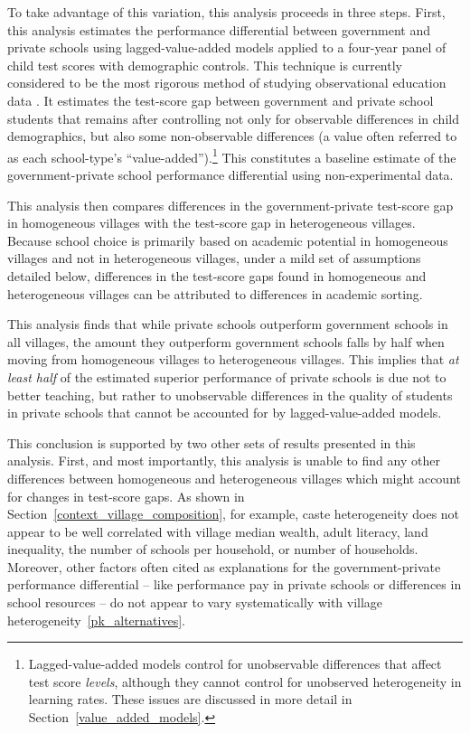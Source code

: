 \documentclass[Eubank_pk_ethnic_sorting.tex]{subfiles}
\begin{document}
To take advantage of this variation, this analysis proceeds in three steps. First, this analysis estimates the performance differential between government and private schools using lagged-value-added models applied to a four-year panel of child test scores with demographic controls. This technique is currently considered to be the most rigorous method of studying observational education data \citep{Gordon:2006wt,McCaffrey:2003vk,Hanushek:2003hz}. It estimates the test-score gap between government and private school students that remains after controlling not only for observable differences in child demographics, but also some non-observable differences (a value often referred to as each school-type's ``value-added'').\footnote{Lagged-value-added models control for unobservable differences that affect test score \emph{levels}, although they cannot control for unobserved heterogeneity in learning rates. These issues are discussed in more detail in Section~\ref{value_added_models}.} This constitutes a baseline estimate of the government-private school performance differential using non-experimental data.

This analysis then compares differences in the government-private test-score gap in homogeneous villages with the test-score gap in heterogeneous villages. Because school choice is primarily based on academic potential in homogeneous villages and not in heterogeneous villages, under a mild set of assumptions detailed below, differences in the test-score gaps found in homogeneous and heterogeneous villages can be attributed to differences in academic sorting.

This analysis finds that while private schools outperform government schools in all villages, the amount they outperform government schools falls by half when moving from homogeneous villages to heterogeneous villages. This implies that \emph{at least half} of the estimated superior performance of private schools is due not to better teaching, but rather to unobservable differences in the quality of students in private schools that cannot be accounted for by lagged-value-added models. 

This conclusion is supported by two other sets of results presented in this analysis. First, and most importantly, this analysis is unable to find any other differences between homogeneous and heterogeneous villages which might account for changes in test-score gaps. As shown in Section~\ref{context_village_composition}, for example, caste heterogeneity does not appear to be well correlated with village median wealth, adult literacy, land inequality, the number of schools per household, or number of households. Moreover, other factors often cited as explanations for the government-private performance differential -- like performance pay in private schools or differences in school resources --  do not appear to vary systematically with village heterogeneity~\ref{pk_alternatives}. 
\end{document}
